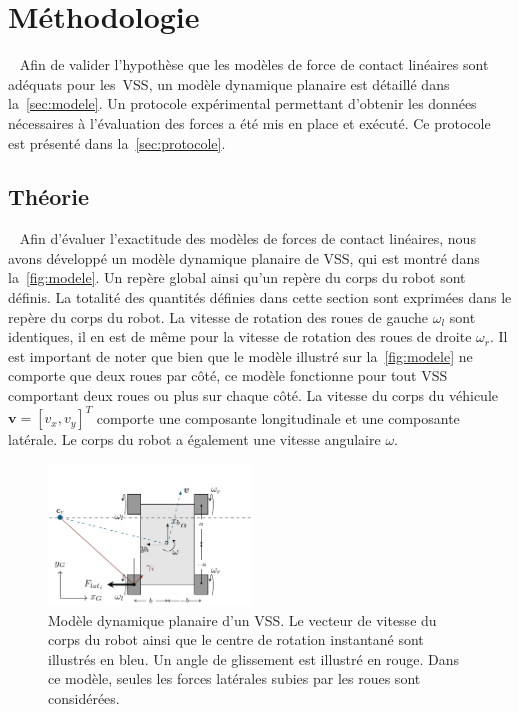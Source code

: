 \section{Méthodologie}~\label{sec:metho}
Afin de valider l'hypothèse que les modèles de force de contact linéaires sont adéquats pour les~\ac{VSS}, un modèle dynamique planaire est détaillé dans la~\autoref{sec:modele}.
Un protocole expérimental permettant d'obtenir les données nécessaires à l'évaluation des forces a été mis en place et exécuté.
Ce protocole est présenté dans la~\autoref{sec:protocole}.

\subsection{Théorie}~\label{sec:modele}
Afin d'évaluer l'exactitude des modèles de forces de contact linéaires, nous avons développé un modèle dynamique planaire de \ac{VSS}, qui est montré dans la~\autoref{fig:modele}.
Un repère global ainsi qu'un repère du corps du robot sont définis.
La totalité des quantités définies dans cette section sont exprimées dans le repère du corps du robot.
La vitesse de rotation des roues de gauche $\omega_l$ sont identiques, il en est de même pour la vitesse de rotation des roues de droite $\omega_r$. 
Il est important de noter que bien que le modèle illustré sur la~\autoref{fig:modele} ne comporte que deux roues par côté, ce modèle fonctionne pour tout \ac{VSS} comportant deux roues ou plus sur chaque côté.
La vitesse du corps du véhicule $\bm v = [v_x, v_y]^T$ comporte une composante longitudinale et une composante latérale.
Le corps du robot a également une vitesse angulaire $\omega$.

\begin{figure}[htpb]
	\centering
	\includegraphics[width=0.48\textwidth]{figs/modele.pdf}
	\caption{Modèle dynamique planaire d'un \ac{VSS}.
			Le vecteur de vitesse du corps du robot ainsi que le centre de rotation instantané sont illustrés en bleu.
			Un angle de glissement est illustré en rouge.
			Dans ce modèle, seules les forces latérales subies par les roues sont considérées.}
	\label{fig:modele}
\end{figure}

